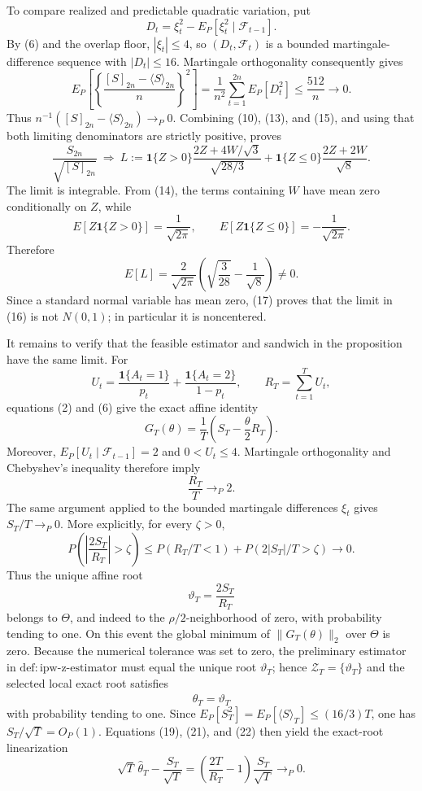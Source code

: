 To compare realized and predictable quadratic variation, put
\[
 D_t=\xi_t^2-E_P[\xi_t^2\mid\mathcal F_{t-1}].
\]
By (6) and the overlap floor, \(|\xi_t|\le4\), so \((D_t,\mathcal F_t)\) is a bounded martingale-difference sequence with \(|D_t|\le16\). Martingale orthogonality consequently gives
\[
 E_P\!\left[\left\{\frac{[S]_{2n}-\langle S\rangle_{2n}}{n}\right\}^2\right]
 =\frac1{n^2}\sum_{t=1}^{2n}E_P[D_t^2]
 \le\frac{512}{n}\longrightarrow0.
\tag{15}
\]
Thus \(n^{-1}([S]_{2n}-\langle S\rangle_{2n})\to_P0\). Combining (10), (13), and (15), and using that both limiting denominators are strictly positive, proves
\[
 \frac{S_{2n}}{\sqrt{[S]_{2n}}}
 \ \Longrightarrow\ 
 L:=\mathbf1\{Z>0\}\frac{2Z+4W/\sqrt3}{\sqrt{28/3}}
 +\mathbf1\{Z\le0\}\frac{2Z+2W}{\sqrt8}.
\tag{16}
\]
The limit is integrable. From (14), the terms containing \(W\) have mean zero conditionally on \(Z\), while
\[
 E[Z\mathbf1\{Z>0\}]=\frac1{\sqrt{2\pi}},
 \qquad
 E[Z\mathbf1\{Z\le0\}]=-\frac1{\sqrt{2\pi}}.
\]
Therefore
\[
 E[L]
 =\frac2{\sqrt{2\pi}}
 \left(\sqrt{\frac3{28}}-\frac1{\sqrt8}\right)\ne0.
\tag{17}
\]
Since a standard normal variable has mean zero, (17) proves that the limit in (16) is not \(N(0,1)\); in particular it is noncentered.

It remains to verify that the feasible estimator and sandwich in the proposition have the same limit. For
\[
 U_t=\frac{\mathbf1\{A_t=1\}}{p_t}
 +\frac{\mathbf1\{A_t=2\}}{1-p_t},
 \qquad R_T=\sum_{t=1}^TU_t,
\]
equations (2) and (6) give the exact affine identity
\[
 G_T(\theta)=\frac1T\left(S_T-\frac\theta2R_T\right).
\tag{18}
\]
Moreover, \(E_P[U_t\mid\mathcal F_{t-1}]=2\) and \(0<U_t\le4\). Martingale orthogonality and Chebyshev's inequality therefore imply
\[
 \frac{R_T}{T}\to_P2.
\tag{19}
\]
The same argument applied to the bounded martingale differences \(\xi_t\) gives \(S_T/T\to_P0\). More explicitly, for every \(\zeta>0\),
\[
 P\!\left(\left|\frac{2S_T}{R_T}\right|>\zeta\right)
 \le P(R_T/T<1)+P(2|S_T|/T>\zeta)\longrightarrow0.
\tag{20}
\]
Thus the unique affine root
\[
 \vartheta_T=\frac{2S_T}{R_T}
\tag{21}
\]
belongs to \(\Theta\), and indeed to the \(\rho/2\)-neighborhood of zero, with probability tending to one. On this event the global minimum of \(\|G_T(\theta)\|_2\) over \(\Theta\) is zero. Because the numerical tolerance was set to zero, the preliminary estimator in \(\mathrm{def:ipw\text{-}z\text{-}estimator}\) must equal the unique root \(\vartheta_T\); hence \(\mathcal Z_T=\{\vartheta_T\}\) and the selected local exact root satisfies
\[
 \widehat\theta_T=\vartheta_T
\tag{22}
\]
with probability tending to one. Since \(E_P[S_T^2]=E_P[\langle S\rangle_T]\le(16/3)T\), one has \(S_T/\sqrt T=O_P(1)\). Equations (19), (21), and (22) then yield the exact-root linearization
\[
 \sqrt T\,\widehat\theta_T-\frac{S_T}{\sqrt T}
 =\left(\frac{2T}{R_T}-1\right)\frac{S_T}{\sqrt T}
 \to_P0.
\tag{23}
\]

